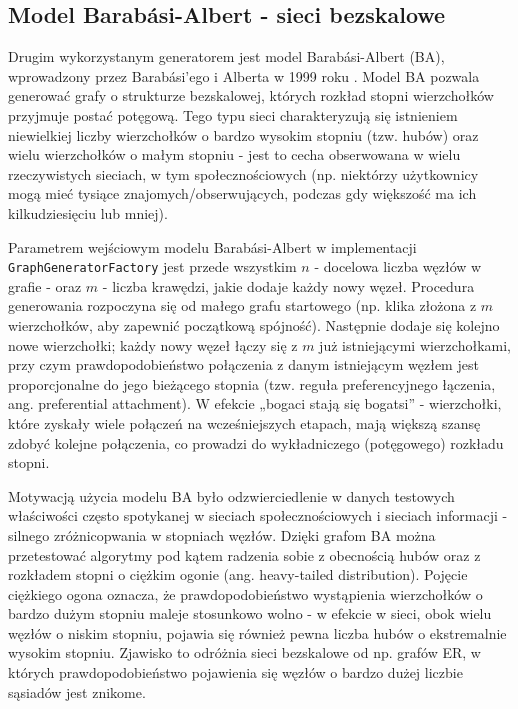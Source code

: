 \subsection{Model Barabási-Albert - sieci bezskalowe}
Drugim wykorzystanym generatorem jest model Barabási-Albert (BA), wprowadzony przez Barabási’ego i Alberta w 1999 roku \cite{barabasi1999emergence}. Model BA pozwala generować grafy o strukturze bezskalowej, których rozkład stopni wierzchołków przyjmuje postać potęgową. Tego typu sieci charakteryzują się istnieniem niewielkiej liczby wierzchołków o bardzo wysokim stopniu (tzw. hubów) oraz wielu wierzchołków o małym stopniu - jest to cecha obserwowana w wielu rzeczywistych sieciach, w tym społecznościowych (np. niektórzy użytkownicy mogą mieć tysiące znajomych/obserwujących, podczas gdy większość ma ich kilkudziesięciu lub mniej).

Parametrem wejściowym modelu Barabási-Albert w implementacji \texttt{GraphGeneratorFactory} jest przede wszystkim $n$ - docelowa liczba węzłów w grafie - oraz $m$ - liczba krawędzi, jakie dodaje każdy nowy węzeł. Procedura generowania rozpoczyna się od małego grafu startowego (np. klika złożona z $m$ wierzchołków, aby zapewnić początkową spójność). Następnie dodaje się kolejno nowe wierzchołki; każdy nowy węzeł łączy się z $m$ już istniejącymi wierzchołkami, przy czym prawdopodobieństwo połączenia z danym istniejącym węzłem jest proporcjonalne do jego bieżącego stopnia (tzw. reguła preferencyjnego łączenia, ang. preferential attachment). W efekcie „bogaci stają się bogatsi” - wierzchołki, które zyskały wiele połączeń na wcześniejszych etapach, mają większą szansę zdobyć kolejne połączenia, co prowadzi do wykładniczego (potęgowego) rozkładu stopni.

Motywacją użycia modelu BA było odzwierciedlenie w danych testowych właściwości często spotykanej w sieciach społecznościowych i sieciach informacji - silnego zróżnicopwania w stopniach węzłów. Dzięki grafom BA można przetestować algorytmy pod kątem radzenia sobie z obecnością hubów oraz z rozkładem stopni o ciężkim ogonie (ang. heavy-tailed distribution). Pojęcie ciężkiego ogona oznacza, że prawdopodobieństwo wystąpienia wierzchołków o bardzo dużym stopniu maleje stosunkowo wolno - w efekcie w sieci, obok wielu węzłów o niskim stopniu, pojawia się również pewna liczba hubów o ekstremalnie wysokim stopniu. Zjawisko to odróżnia sieci bezskalowe od np. grafów ER, w których prawdopodobieństwo pojawienia się węzłów o bardzo dużej liczbie sąsiadów jest znikome.

